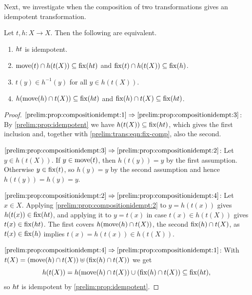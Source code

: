 Next, we investigate when the composition of two transformations gives an
idempotent transformation.

\begin{proposition} \label{prelim:prop:compositionidempt}
	Let $t, h \colon X \to X$. Then the following are equivalent.
	\begin{enumerate}
		\item \label{prelim:prop:compositionidempt:1} $\concat{t}{h}$ is idempotent.
		
		\item \label{prelim:prop:compositionidempt:3}
		$\move{t} \cap h(t(X)) \subseteq \fix{\concat{t}{h}}$ and $\fix{t} \cap h(t(X)) \subseteq \fix{h}$.
		
		\item \label{prelim:prop:compositionidempt:2} $t(y) \in h^{-1}(y)$ for all $y \in h(t(X))$.
		
		\item \label{prelim:prop:compositionidempt:4} $h(\move{h} \cap t(X)) \subseteq \fix{\concat{t}{h}}$
		and $\fix{h} \cap t(X) \subseteq \fix{\concat{t}{h}}$.
	\end{enumerate}
\end{proposition}
\begin{proof}
	$\ref{prelim:prop:compositionidempt:1} \Rightarrow \ref{prelim:prop:compositionidempt:3}$:
	By \cref{prelim:prop:idempotent} we have
	$h(t(X)) \subseteq \fix{\concat{t}{h}}$, which gives the first inclusion
	and, together with \cref{prelim:trans:eqn:fix-comp}, also the second.
	
	$\ref{prelim:prop:compositionidempt:3} \Rightarrow \ref{prelim:prop:compositionidempt:2}$:
	Let $y \in h(t(X))$.
	If $y \in \move{t}$, then $h(t(y)) = y$ by the first assumption.
	Otherwise $y \in \fix{t}$, so $h(y) = y$ by the second assumption and hence
	$h(t(y)) = h(y) = y$.
	
	$\ref{prelim:prop:compositionidempt:2} \Rightarrow \ref{prelim:prop:compositionidempt:4}$:
	Let $x \in X$. Applying \ref{prelim:prop:compositionidempt:2} to
	$y = h(t(x))$ gives $h(t(x)) \in \fix{\concat{t}{h}}$, and applying it to
	$y = t(x)$ in case $t(x) \in h(t(X))$ gives $t(x) \in \fix{\concat{t}{h}}$.
	The first covers $h(\move{h} \cap t(X))$, the second $\fix{h} \cap t(X)$, as
	$t(x) \in \fix{h}$ implies $t(x) = h(t(x)) \in h(t(X))$.
	
	$\ref{prelim:prop:compositionidempt:4} \Rightarrow \ref{prelim:prop:compositionidempt:1}$:
	With $t(X) = ( \move{h} \cap t(X) ) \uplus ( \fix{h} \cap t(X) )$ we get
	\[
	h(t(X)) = h(\move{h} \cap t(X)) \cup ( \fix{h}\cap t(X) ) \subseteq \fix{\concat{t}{h}},
	\]
	so $\concat{t}{h}$ is idempotent by \cref{prelim:prop:idempotent}.
\end{proof}

